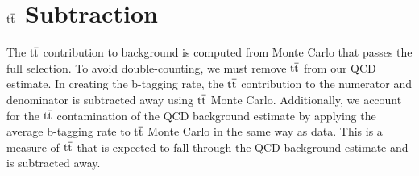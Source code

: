 \section{$\mathrm{t\overline{t}}$ Subtraction}
\label{sec:ttSubtraction}
\label{sec:bsttSubtraction}
The $\mathrm{t\overline{t}}$ contribution to background is computed from Monte Carlo that passes the full selection. To avoid double-counting, we must remove $\mathrm{t\overline{t}}$ from our QCD estimate. 
In creating the b-tagging rate, the $\mathrm{t\overline{t}}$ contribution to the numerator and denominator is subtracted away using $\mathrm{t\overline{t}}$ Monte Carlo. 
Additionally, we account for the $\mathrm{t\overline{t}}$ contamination of the QCD background estimate by applying 
the average b-tagging rate to $\mathrm{t\overline{t}}$ Monte Carlo in the same way as data.  This is a measure of $\mathrm{t\overline{t}}$ that is expected to fall 
through the QCD background estimate and is subtracted away. 


